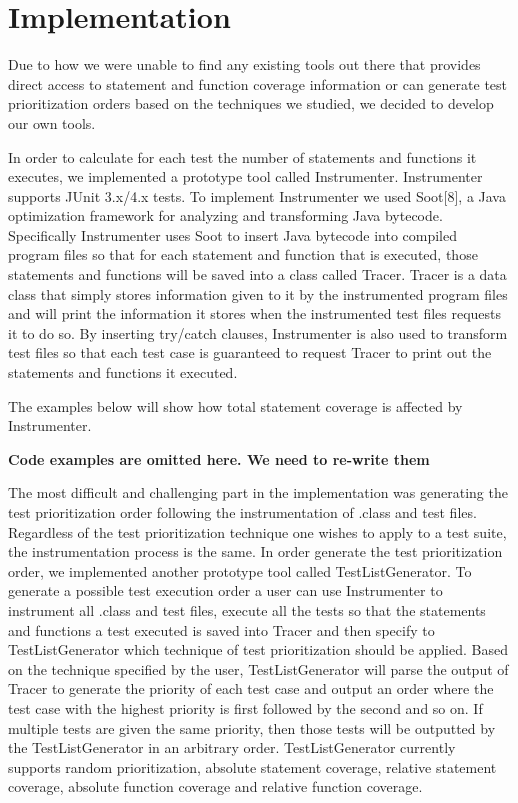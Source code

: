 \section{Implementation}

Due to how we were unable to find any existing tools out there that provides direct access to statement and function coverage information or can generate test prioritization orders based on the techniques we studied, we decided to develop our own tools.

In order to calculate for each test the number of statements and functions it executes, we implemented a prototype tool called Instrumenter. Instrumenter supports JUnit 3.x/4.x tests. To implement Instrumenter we used Soot[8], a Java optimization framework for analyzing and transforming Java bytecode. Specifically Instrumenter uses Soot to insert Java bytecode into compiled program files so that for each statement and function that is executed, those statements and functions will be saved into a class called Tracer. Tracer is a data class that simply stores information given to it by the instrumented program files and will print the information it stores when the instrumented test files requests it to do so. By inserting try/catch clauses, Instrumenter is also used to transform test files so that each test case is guaranteed to request Tracer to print out the statements and functions it executed. 

The examples below will show how total statement coverage is affected by Instrumenter. 

\textbf{Code examples are omitted here. We need to re-write them}

The most difficult and challenging part in the implementation was generating the test prioritization order following the instrumentation of .class and test files. Regardless of the test prioritization technique one wishes to apply to a test suite, the instrumentation process is the same. In order generate the test prioritization order, we implemented another prototype tool called TestListGenerator. To generate a possible test execution order a user can use Instrumenter to instrument all .class and test files, execute all the tests so that the statements and functions a test executed is saved into Tracer and then specify to TestListGenerator which technique of test prioritization should be applied. Based on the technique specified by the user, TestListGenerator will parse the output of Tracer to generate the priority of each test case and output an order where the test case with the highest priority is first followed by the second and so on. If multiple tests are given the same priority, then those tests will be outputted by the TestListGenerator in an arbitrary order. TestListGenerator currently supports random prioritization, absolute statement coverage, relative statement coverage, absolute function coverage and relative function coverage. 

